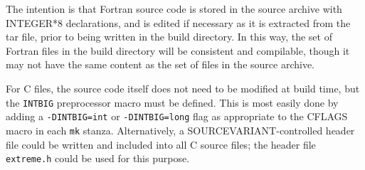 \documentclass[twoside,11pt]{article}
\renewcommand{\_}{\texttt{\symbol{95}}}
\newcommand{\file}[1]{{\tt #1}}
\newcommand{\cc}[1]{{\tt #1}}
\begin{document}
The intention is that Fortran source code is stored in the source
archive with INTEGER*8 declarations,
and is edited if necessary
as it is extracted from the tar file, prior to being
written in the build directory.
In this way, the set of Fortran files in the build directory
will be consistent and compilable,
though it
may not have the same content as the set of files in the source archive.

For C files, the source code itself does not need to be modified at
build time, but the \cc{INT\_BIG} preprocessor macro must be defined.
This is most easily done by adding a \cc{-DINT\_BIG=int} or
\cc{-DINT\_BIG=long} flag as appropriate to the
CFLAGS macro in each \file{mk} stanza.
Alternatively, a SOURCE\_VARIANT-controlled header file could be
written and included into all C source files;
the header file \file{extreme.h} could be used
for this purpose.
\end{document}
